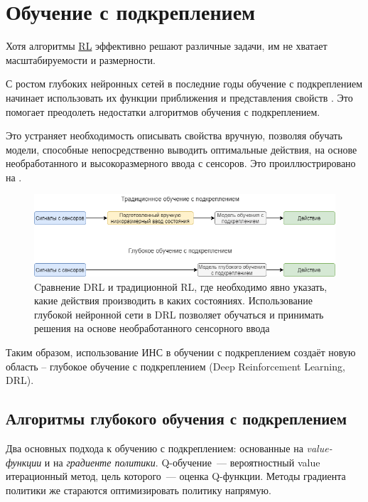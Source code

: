 \section{Обучение с подкреплением} \label{ch1:rl}

Хотя алгоритмы \hyperref[acr:rl]{RL} эффективно решают различные задачи, им не хватает масштабируемости и размерности.

С ростом глубоких нейронных сетей в последние годы обучение с подкреплением начинает использовать их функции приближения и представления свойств \cite{HORNIK1991251}. Это помогает преодолеть недостатки алгоритмов обучения с подкреплением.

Это устраняет необходимость описывать свойства вручную, позволяя обучать модели, способные непосредственно выводить оптимальные действия, на основе необработанного и высокоразмерного ввода с сенсоров. Это проиллюстрировано на .

\begin{figure}[ht!]
    \center
    \includegraphics [scale=0.65] {my_folder/images/ch1/DRL-flow.png}
    \caption{Cравнение DRL и традиционной RL, где необходимо явно указать, какие действия производить в каких состояниях. Использование глубокой нейронной сети в DRL позволяет обучаться и принимать решения на основе необработанного сенсорного ввода}
    \label{fig:DRL-flow}
\end{figure}

Таким образом, использование ИНС в обучении с подкреплением создаёт новую область – глубокое обучение с подкреплением (Deep Reinforcement Learning, DRL).

\subsection{Алгоритмы глубокого обучения с подкреплением}

Два основных подхода к обучению с подкреплением: основанные на \textit{value-функции} и на \textit{градиенте политики}. Q-обучение~--- вероятностный value итерационный метод, цель которого~--- оценка Q-функции. Методы градиента политики же стараются оптимизировать политику напрямую.

